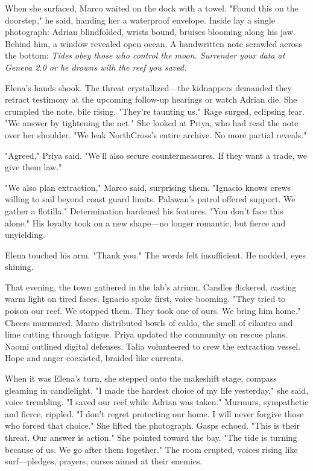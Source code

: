 When she surfaced, Marco waited on the dock with a towel. "Found this on the doorstep," he said, handing her a waterproof envelope. Inside lay a single photograph: Adrian blindfolded, wrists bound, bruises blooming along his jaw. Behind him, a window revealed open ocean. A handwritten note scrawled across the bottom: \textit{Tides obey those who control the moon. Surrender your data at Geneva 2.0 or he drowns with the reef you saved.}

Elena's hands shook. The threat crystallized—the kidnappers demanded they retract testimony at the upcoming follow-up hearings or watch Adrian die. She crumpled the note, bile rising. "They're taunting us." Rage surged, eclipsing fear. "We answer by tightening the net." She looked at Priya, who had read the note over her shoulder. "We leak NorthCross's entire archive. No more partial reveals."

"Agreed," Priya said. "We'll also secure countermeasures. If they want a trade, we give them law."

"We also plan extraction," Marco said, surprising them. "Ignacio knows crews willing to sail beyond coast guard limits. Palawan's patrol offered support. We gather a flotilla." Determination hardened his features. "You don't face this alone." His loyalty took on a new shape—no longer romantic, but fierce and unyielding.

Elena touched his arm. "Thank you." The words felt insufficient. He nodded, eyes shining.

That evening, the town gathered in the lab's atrium. Candles flickered, casting warm light on tired faces. Ignacio spoke first, voice booming. "They tried to poison our reef. We stopped them. They took one of ours. We bring him home." Cheers murmured. Marco distributed bowls of caldo, the smell of cilantro and lime cutting through fatigue. Priya updated the community on rescue plans. Naomi outlined digital defenses. Talia volunteered to crew the extraction vessel. Hope and anger coexisted, braided like currents.

When it was Elena's turn, she stepped onto the makeshift stage, compass gleaming in candlelight. "I made the hardest choice of my life yesterday," she said, voice trembling. "I saved our reef while Adrian was taken." Murmurs, sympathetic and fierce, rippled. "I don't regret protecting our home. I will never forgive those who forced that choice." She lifted the photograph. Gasps echoed. "This is their threat. Our answer is action." She pointed toward the bay. "The tide is turning because of us. We go after them together." The room erupted, voices rising like surf—pledges, prayers, curses aimed at their enemies.

